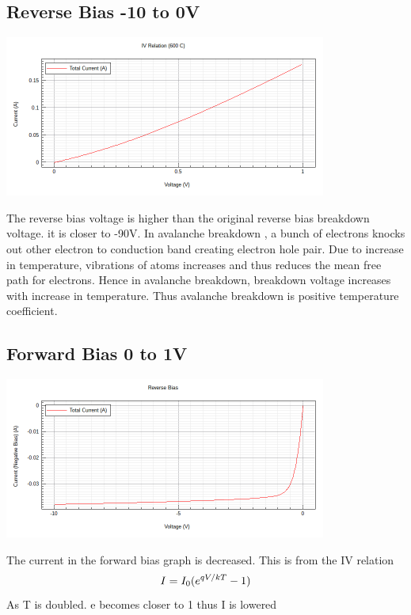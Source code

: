 \documentclass[12pt]{article}
\begin{document}
\subsection{Reverse Bias -10 to 0V}
\includegraphics[width=\textwidth, height=200px]{4a.png}

The reverse bias voltage is higher than the original reverse bias breakdown voltage. it is closer to -90V. In avalanche breakdown , a bunch of electrons knocks out other electron to conduction band creating electron hole pair. Due to increase in temperature, vibrations of atoms increases and thus reduces the mean free path for electrons. Hence in avalanche breakdown, breakdown voltage increases with increase in temperature. Thus avalanche breakdown is positive temperature coefficient.
\subsection{Forward Bias 0 to 1V}
\includegraphics[width=\textwidth, height=200px]{4b.png}

The current in the forward bias graph is decreased. This is from the IV relation\\
\begin{equation*}
I = I_0(e^{qV/kT} - 1)\\
\end{equation*}
As T is doubled. e becomes closer to 1 thus I is lowered
\end{document}
